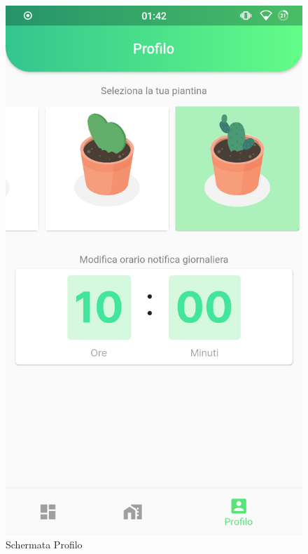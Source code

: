 \begin{figure}[h!]
\centering
\includegraphics[width=\textwidth]{img/profilo}
\caption{Schermata Profilo}
\label{fig:profilo}
\end{figure}